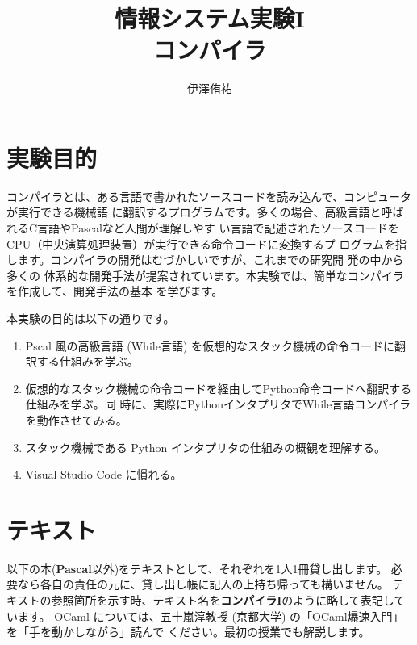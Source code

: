 \documentclass[a4paper,11pt]{jsarticle}
\title{{\bf 情報システム実験I\\コンパイラ}}
\author{伊澤侑祐}
\date{}
\begin{document}
\maketitle

\section{実験目的}
コンパイラとは、ある言語で書かれたソースコードを読み込んで、コンピュータが実行できる機械語
に翻訳するプログラムです。多くの場合、高級言語と呼ばれるC言語やPascalなど人間が理解しやす
い言語で記述されたソースコードをCPU（中央演算処理装置）が実行できる命令コードに変換するプ
ログラムを指します。コンパイラの開発はむづかしいですが、これまでの研究開 発の中から多くの
体系的な開発手法が提案されています。本実験では、簡単なコンパイラを作成して、開発手法の基本
を学びます。


本実験の目的は以下の通りです。

\begin{enumerate}
\item Pscal 風の高級言語 (While言語) を仮想的なスタック機械の命令コードに翻訳する仕組みを学ぶ。
\item 仮想的なスタック機械の命令コードを経由してPython命令コードへ翻訳する仕組みを学ぶ。同
  時に、実際にPythonインタプリタでWhile言語コンパイラを動作させてみる。
\item スタック機械である Python インタプリタの仕組みの概観を理解する。
\item Visual Studio Code に慣れる。
\end{enumerate}

\section{テキスト}\label{text}

以下の本(\textbf{Pascal}以外)をテキストとして、それぞれを1人1冊貸し出します。
必要なら各自の責任の元に、貸し出し帳に記入の上持ち帰っても構いません。
テキストの参照箇所を示す時、テキスト名を\textbf{コンパイラI}のように略して表記しています。
OCaml については、五十嵐淳教授 (京都大学) の「OCaml爆速入門」を「手を動かしながら」読んで
ください。最初の授業でも解説します。
\end{document}

